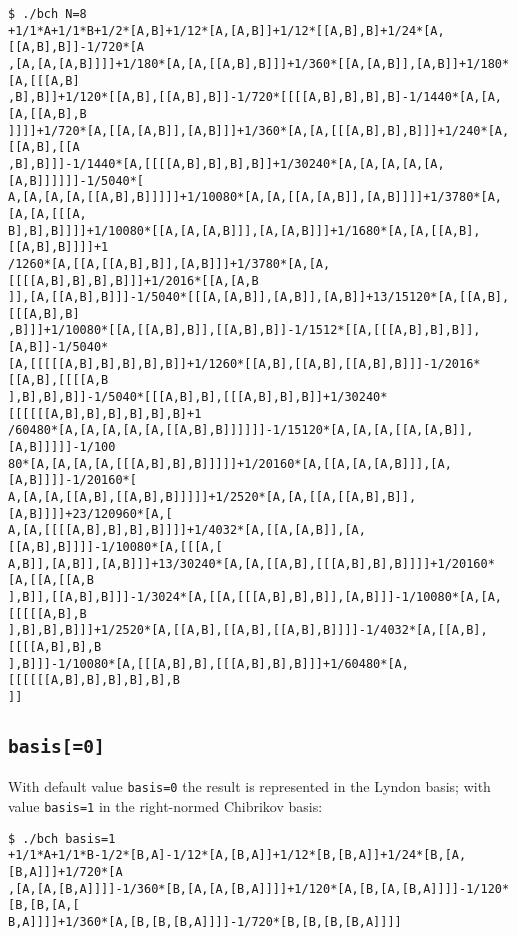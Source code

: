 \documentclass[11pt,a4paper]{article}
\begin{document}
\medskip

{\small\begin{BVerbatim}
$ ./bch N=8
+1/1*A+1/1*B+1/2*[A,B]+1/12*[A,[A,B]]+1/12*[[A,B],B]+1/24*[A,[[A,B],B]]-1/720*[A
,[A,[A,[A,B]]]]+1/180*[A,[A,[[A,B],B]]]+1/360*[[A,[A,B]],[A,B]]+1/180*[A,[[[A,B]
,B],B]]+1/120*[[A,B],[[A,B],B]]-1/720*[[[[A,B],B],B],B]-1/1440*[A,[A,[A,[[A,B],B
]]]]+1/720*[A,[[A,[A,B]],[A,B]]]+1/360*[A,[A,[[[A,B],B],B]]]+1/240*[A,[[A,B],[[A
,B],B]]]-1/1440*[A,[[[[A,B],B],B],B]]+1/30240*[A,[A,[A,[A,[A,[A,B]]]]]]-1/5040*[
A,[A,[A,[A,[[A,B],B]]]]]+1/10080*[A,[A,[[A,[A,B]],[A,B]]]]+1/3780*[A,[A,[A,[[[A,
B],B],B]]]]+1/10080*[[A,[A,[A,B]]],[A,[A,B]]]+1/1680*[A,[A,[[A,B],[[A,B],B]]]]+1
/1260*[A,[[A,[[A,B],B]],[A,B]]]+1/3780*[A,[A,[[[[A,B],B],B],B]]]+1/2016*[[A,[A,B
]],[A,[[A,B],B]]]-1/5040*[[[A,[A,B]],[A,B]],[A,B]]+13/15120*[A,[[A,B],[[[A,B],B]
,B]]]+1/10080*[[A,[[A,B],B]],[[A,B],B]]-1/1512*[[A,[[[A,B],B],B]],[A,B]]-1/5040*
[A,[[[[[A,B],B],B],B],B]]+1/1260*[[A,B],[[A,B],[[A,B],B]]]-1/2016*[[A,B],[[[[A,B
],B],B],B]]-1/5040*[[[A,B],B],[[[A,B],B],B]]+1/30240*[[[[[[A,B],B],B],B],B],B]+1
/60480*[A,[A,[A,[A,[A,[[A,B],B]]]]]]-1/15120*[A,[A,[A,[[A,[A,B]],[A,B]]]]]-1/100
80*[A,[A,[A,[A,[[[A,B],B],B]]]]]+1/20160*[A,[[A,[A,[A,B]]],[A,[A,B]]]]-1/20160*[
A,[A,[A,[[A,B],[[A,B],B]]]]]+1/2520*[A,[A,[[A,[[A,B],B]],[A,B]]]]+23/120960*[A,[
A,[A,[[[[A,B],B],B],B]]]]+1/4032*[A,[[A,[A,B]],[A,[[A,B],B]]]]-1/10080*[A,[[[A,[
A,B]],[A,B]],[A,B]]]+13/30240*[A,[A,[[A,B],[[[A,B],B],B]]]]+1/20160*[A,[[A,[[A,B
],B]],[[A,B],B]]]-1/3024*[A,[[A,[[[A,B],B],B]],[A,B]]]-1/10080*[A,[A,[[[[[A,B],B
],B],B],B]]]+1/2520*[A,[[A,B],[[A,B],[[A,B],B]]]]-1/4032*[A,[[A,B],[[[[A,B],B],B
],B]]]-1/10080*[A,[[[A,B],B],[[[A,B],B],B]]]+1/60480*[A,[[[[[[A,B],B],B],B],B],B
]]
\end{BVerbatim}
}


\subsection*{\tt basis[=0]}
With default value \verb|basis=0| the result is represented in the 
Lyndon basis;   with  value \verb|basis=1| in the right-normed Chibrikov basis:

\medskip

{\small\begin{BVerbatim}
$ ./bch basis=1
+1/1*A+1/1*B-1/2*[B,A]-1/12*[A,[B,A]]+1/12*[B,[B,A]]+1/24*[B,[A,[B,A]]]+1/720*[A
,[A,[A,[B,A]]]]-1/360*[B,[A,[A,[B,A]]]]+1/120*[A,[B,[A,[B,A]]]]-1/120*[B,[B,[A,[
B,A]]]]+1/360*[A,[B,[B,[B,A]]]]-1/720*[B,[B,[B,[B,A]]]]
\end{BVerbatim}
}
\end{document}
